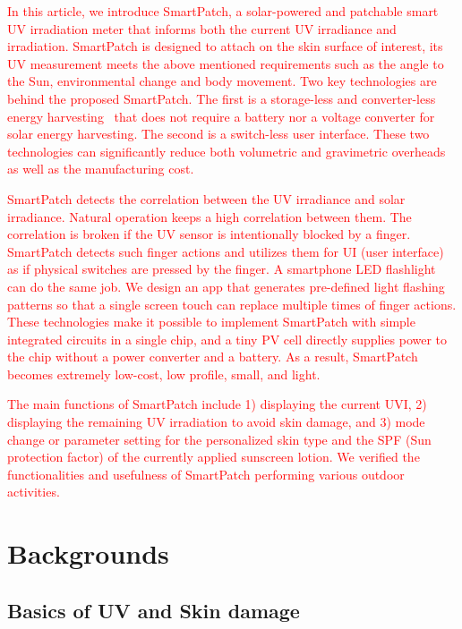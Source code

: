 \documentclass[journal]{IEEEtran}
\begin{document}
\textcolor{red}{In this article, we introduce SmartPatch, a solar-powered and patchable smart UV irradiation meter that informs both the current UV irradiance and irradiation. SmartPatch is designed to attach on the skin surface of interest, its UV measurement meets the above mentioned requirements such as the angle to the Sun, environmental change and body movement. Two key technologies are behind the proposed SmartPatch. The first is a storage-less and converter-less energy harvesting~\cite{Lee:ASPDAC15} that does not require a battery nor a voltage converter for solar energy harvesting. The second is a switch-less user interface. These two technologies can significantly reduce both volumetric and gravimetric overheads as well as the manufacturing cost.}

\textcolor{red}{SmartPatch detects the correlation between the UV irradiance and solar irradiance. Natural operation keeps a high correlation between them. The correlation is broken if the UV sensor is intentionally blocked by a finger. SmartPatch detects such finger actions and utilizes them for UI (user interface) as if physical switches are pressed by the finger. A smartphone LED flashlight can do the same job. We design an app that  generates pre-defined light flashing patterns so that a single screen touch can replace multiple times of finger actions. These technologies make it possible to implement SmartPatch with simple integrated circuits in a single chip, and a tiny PV cell directly supplies power to the chip without a power converter and a battery. As a result, SmartPatch becomes extremely low-cost, low profile, small, and light.}

 \textcolor{red}{The main functions of SmartPatch include 1) displaying the current UVI, 2) displaying the remaining UV irradiation to avoid skin damage, and 3) mode change or parameter setting for the personalized skin type and the SPF (Sun protection factor) of the currently applied sunscreen lotion. We verified the functionalities and usefulness of SmartPatch performing various outdoor activities.}

\section{Backgrounds}

\subsection{Basics of UV and Skin damage}
\end{document}
